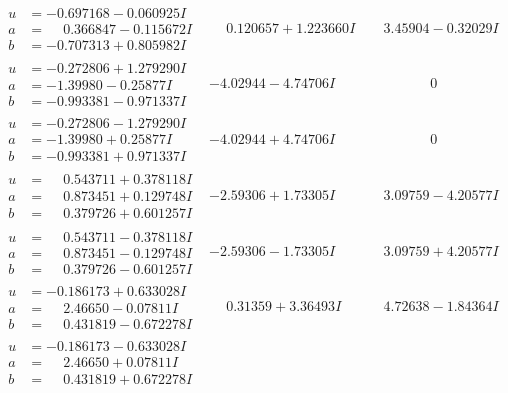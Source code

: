 \documentclass[1p]{elsarticle_modified}
\theoremstyle{definition}
\begin{document}
$$\begin{array}{c|c|c}
\begin{aligned}
u &= -0.697168 - 0.060925 I \\
a &= \phantom{-}0.366847 - 0.115672 I \\
b &= -0.707313 + 0.805982 I\end{aligned}
 & \phantom{-}0.120657 + 1.223660 I & \phantom{-}3.45904 - 0.32029 I \\ \hline\begin{aligned}
u &= -0.272806 + 1.279290 I \\
a &= -1.39980 - 0.25877 I \\
b &= -0.993381 - 0.971337 I\end{aligned}
 & -4.02944 - 4.74706 I & \phantom{-0.000000 } 0 \\ \hline\begin{aligned}
u &= -0.272806 - 1.279290 I \\
a &= -1.39980 + 0.25877 I \\
b &= -0.993381 + 0.971337 I\end{aligned}
 & -4.02944 + 4.74706 I & \phantom{-0.000000 } 0 \\ \hline\begin{aligned}
u &= \phantom{-}0.543711 + 0.378118 I \\
a &= \phantom{-}0.873451 + 0.129748 I \\
b &= \phantom{-}0.379726 + 0.601257 I\end{aligned}
 & -2.59306 + 1.73305 I & \phantom{-}3.09759 - 4.20577 I \\ \hline\begin{aligned}
u &= \phantom{-}0.543711 - 0.378118 I \\
a &= \phantom{-}0.873451 - 0.129748 I \\
b &= \phantom{-}0.379726 - 0.601257 I\end{aligned}
 & -2.59306 - 1.73305 I & \phantom{-}3.09759 + 4.20577 I \\ \hline\begin{aligned}
u &= -0.186173 + 0.633028 I \\
a &= \phantom{-}2.46650 - 0.07811 I \\
b &= \phantom{-}0.431819 - 0.672278 I\end{aligned}
 & \phantom{-}0.31359 + 3.36493 I & \phantom{-}4.72638 - 1.84364 I \\ \hline\begin{aligned}
u &= -0.186173 - 0.633028 I \\
a &= \phantom{-}2.46650 + 0.07811 I \\
b &= \phantom{-}0.431819 + 0.672278 I\end{aligned}

\end{array}$$
\end{document}
